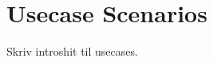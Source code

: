 \documentclass[a4paper,11pt,fleqn,twoside,openright]{memoir} 	%
\begin{document}
\chapter{Usecase Scenarios}
Skriv introshit til usecases.

\end{document}
